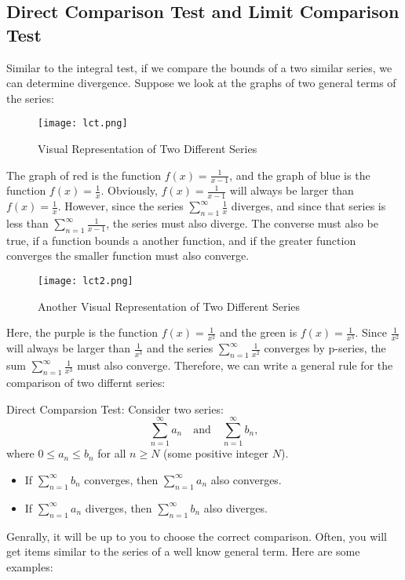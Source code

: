 \documentclass[a4paper, 11pt]{article}
\newenvironment{concept}{%
    \vspace{1em}
    \begin{tcolorbox}[colframe=black!70, colback=white!95, title=Definition]
}{%
    \end{tcolorbox}
    \vspace{1em}
}
\begin{document}
\subsection{Direct Comparison Test and Limit Comparison Test}
Similar to the integral test, if we compare the bounds of a two similar series, we can determine divergence. Suppose we look at the graphs of two general terms of the series: 
\begin{figure}[H]
    \caption{Visual Representation of Two Different Series}
    \centering
    \texttt{[image: lct.png]}
\end{figure}
The graph of red is the function $f(x) = \frac{1}{x-1}$, and the graph of blue is the function $f(x) = \frac{1}{x}$. Obviously, $f(x) = \frac{1}{x-1}$ will always be larger than $f(x) = \frac{1}{x}$. However, since the series $\sum_{n=1}^{\infty} \frac{1}{x}$ diverges, and since that series is less than $\sum_{n=1}^{\infty} \frac{1}{x-1}$, the series must also diverge. The converse must also be true, if a function bounds a another function, and if the greater function converges the smaller function must also converge. 
\begin{figure}[H]
    \caption{Another Visual Representation of Two Different Series}
    \centering
    \texttt{[image: lct2.png]}
\end{figure}
Here, the purple is the function $f(x) = \frac{1}{x^2}$ and the green is $f(x) = \frac{1}{x^3}$. Since $\frac{1}{x^2}$ will always be larger than $\frac{1}{x^3}$ and the series $\sum_{n=1}^{\infty} \frac{1}{x^2}$ converges by p-series, the sum $\sum_{n=1}^{\infty} \frac{1}{x^3}$ must also converge. Therefore, we can write a general rule for the comparison of two differnt series: 
\begin{concept}{Direct Comparsion Test:}
Consider two series:
\[
\sum_{n=1}^\infty a_n \quad \text{and} \quad \sum_{n=1}^\infty b_n,
\]
where \( 0 \leq a_n \leq b_n \) for all \( n \geq N \) (some positive integer \( N \)).
\begin{itemize}
    \item If \( \sum_{n=1}^\infty b_n \) converges, then \( \sum_{n=1}^\infty a_n \) also converges.
    \item If \( \sum_{n=1}^\infty a_n \) diverges, then \( \sum_{n=1}^\infty b_n \) also diverges.
\end{itemize}
\end{concept}
Genrally, it will be up to you to choose the correct comparison. Often, you will get items similar to the series of a well know general term. Here are some examples: 
\end{document}
